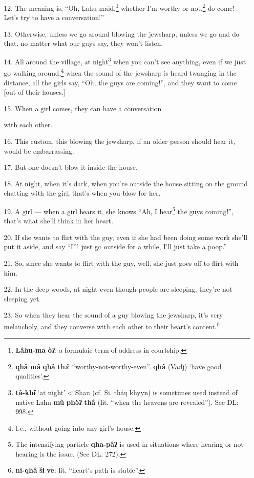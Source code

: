 12. The meaning is, ``Oh, Lahu maid,\footnote{\textbf{Lâhū-ma} \textbf{òʔ}: a formulaic term of address in courtship.} whether I'm worthy or not,\footnote{\textbf{qhâ} \textbf{mâ} \textbf{qhâ} \textbf{thɔ̂}: ``worthy-not-worthy-even''. \textbf{qhâ} (Vadj) `have good qualities'.} do come!
Let's try to have a conversation!''

13. Otherwise, unless we go around blowing the jewsharp, unless we go and do that,
no matter what our guys say, they won't listen.

14. All around the village, at night\footnote{\textbf{tâ-khɨ̂} `at night' < Shan (cf. Si. tháŋ khyyn) is sometimes used instead of native Lahu \textbf{mû} \textbf{phə̀ʔ} \textbf{thâ} (lit. ``when the heavens are revealed''). See DL: 998.} when you can't see anything, even if we
just go walking around,\footnote{I.e., without going into any girl's house.} when the sound of the jewsharp is heard twanging in
the distance, all the girls say, ``Oh, the guys are coming!'', and they want to
come [out of their houses.]

15. When a girl comes, they can have a conversation

with each other.

16. This custom, this blowing the jewsharp, if an older person should hear it,
would be embarrassing.

17. But one doesn't blow it inside the house.

18. At night, when it's dark, when you're outside the house sitting on the ground
chatting with the girl, that's when you blow for her.

19. A girl --- when a girl hears it, she knows ``Ah, I hear\footnote{The intensifying particle \textbf{qha-pâʔ} is used in situations where hearing or not hearing is the issue. (See DL: 272).} the guys coming!'',
that's what she'll think in her heart.

20. If she wants to flirt with the guy, even if she had been doing some work she'll
put it aside, and say ``I'll just go outside for a while, I'll just take a poop.''

21. So, since she wants to flirt with the guy, well, she just goes off to flirt
with him.

22. In the deep woods, at night even though people are sleeping, they're not sleeping
yet.

23. So when they hear the sound of a guy blowing the jewsharp, it's very melancholy,
and they converse with each other to their heart's content.\footnote{\textbf{ni-qhâ} \textbf{šɨ} \textbf{ve}: lit. ``heart's path is stable''.}

